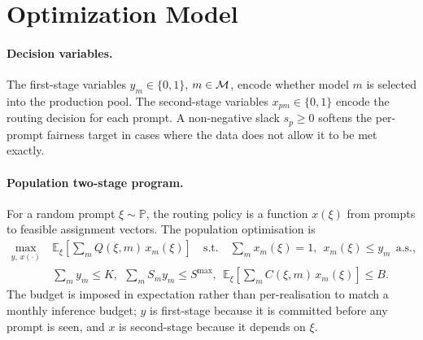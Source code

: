 \documentclass[11pt]{article}
\newcommand{\E}{\mathbb{E}}\newcommand{\R}{\mathbb{R}}
\begin{document}
\section{Optimization Model}
\label{sec:model}

\paragraph{Decision variables.}
The first-stage variables $y_m\in\{0,1\}$, $m\in\mathcal{M}$, encode whether model $m$
is selected into the production pool. The second-stage variables
$x_{pm}\in\{0,1\}$ encode the routing decision for each prompt. A non-negative
slack $s_p\ge 0$ softens the per-prompt fairness target in cases where the
data does not allow it to be met exactly.

\paragraph{Population two-stage program.}
For a random prompt $\xi\sim\mathbb{P}$, the routing policy is a function
$x(\xi)$ from prompts to feasible assignment vectors. The population
optimisation is
\begin{align}
\max_{y,\,x(\cdot)}\
& \E_{\xi}\!\left[\textstyle\sum_{m} Q(\xi,m)\,x_m(\xi)\right]
\quad\text{s.t.}\quad
\textstyle\sum_m x_m(\xi)=1,\ \ x_m(\xi)\le y_m \ \ \text{a.s.},\nonumber\\[-1pt]
& \textstyle\sum_m y_m\le K,\ \ \sum_m S_m y_m \le S^{\max},\ \
  \E_{\xi}\!\left[\sum_m C(\xi,m)\,x_m(\xi)\right]\le B.
\end{align}
The budget is imposed in expectation rather than per-realisation to match a
monthly inference budget; $y$ is first-stage because it is committed before
any prompt is seen, and $x$ is second-stage because it depends on $\xi$.
\end{document}
